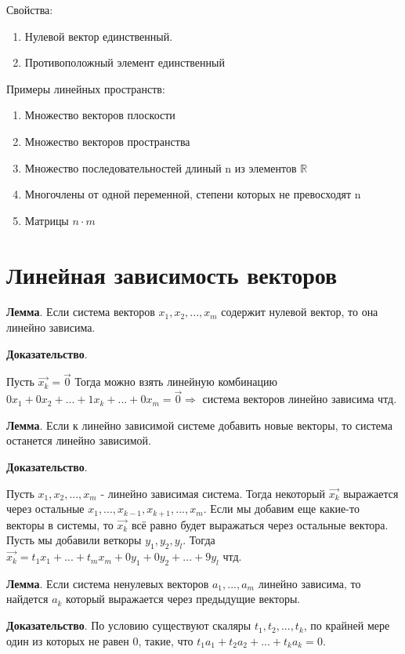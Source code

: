 \documentclass[a4paper]{article}
\begin{document}
Свойства:
\begin{enumerate}
\item Нулевой вектор единственный.
\item Противоположный элемент единственный
\end{enumerate}

Примеры линейных пространств:
\begin{enumerate}
\item Множество векторов плоскости
\item Множество векторов пространства
\item Множество последовательностей длиный n из элементов $\mathbb{R}$
\item Многочлены от одной переменной, степени которых не превосходят n
\item Матрицы $n \cdot m$
\end{enumerate}

\section*{Линейная зависимость векторов}
\textbf{Лемма}. Если система векторов $x_1, x_2, ..., x_m$ содержит нулевой вектор, то она линейно зависима.

\textbf{Доказательство}. 

Пусть $\vec{x_k} = \vec{0}$
Тогда можно взять линейную комбинацию $0x_1 + 0x_2 + ... + 1x_k + ... + 0x_m = \vec{0} \Rightarrow$ система векторов линейно зависима чтд.

\textbf{Лемма}. Если к линейно зависимой системе добавить новые векторы, то система останется линейно зависимой.

\textbf{Доказательство}. 

Пусть  $x_1, x_2, ..., x_m$ - линейно зависимая система. Тогда некоторый $\vec{x_k}$ выражается через остальные $x_1, ..., x_{k-1}, x_{k+1}, ..., x_m$. Если мы добавим еще какие-то векторы в системы, то $\vec{x_k}$ всё равно будет выражаться через остальные вектора. Пусть мы добавили веткоры $y_1, y_2, y_l$. Тогда $\vec{x_k} = t_1x_1 + ... + t_mx_m + 0y_1 +0y_2 + ... + 9y_l$ чтд.


\textbf{Лемма}. Если система ненулевых векторов $a_1, ..., a_m$ линейно зависима, то найдется $a_k$ который выражается через предыдущие векторы.

\textbf{Доказательство}. По условию существуют скаляры $t_1, t_2, ..., t_k$, по крайней мере один из которых не равен 0, такие, что $t_1a_1 + t_2a_2 + ... + t_ka_k = 0$.
\end{document}
